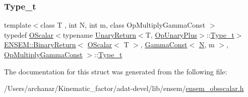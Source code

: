 \subsubsection{\texorpdfstring{Type\_t}{Type\_t}\hspace{0.1cm}{\footnotesize\ttfamily [3/3]}}
{\footnotesize\ttfamily template$<$class T , int N, int m, class Op\+Multiply\+Gamma\+Const $>$ \\
typedef \mbox{\hyperlink{classENSEM_1_1OScalar}{O\+Scalar}}$<$typename \mbox{\hyperlink{structENSEM_1_1UnaryReturn}{Unary\+Return}}$<$T, \mbox{\hyperlink{structENSEM_1_1OpUnaryPlus}{Op\+Unary\+Plus}}$>$\+::\mbox{\hyperlink{structENSEM_1_1BinaryReturn_3_01OScalar_3_01T_01_4_00_01GammaConst_3_01N_00_01m_01_4_00_01OpMultiplyGammaConst_01_4_a5ab97090c2ef0e27b663d6f546b03b3c}{Type\+\_\+t}}$>$ \mbox{\hyperlink{structENSEM_1_1BinaryReturn}{E\+N\+S\+E\+M\+::\+Binary\+Return}}$<$ \mbox{\hyperlink{classENSEM_1_1OScalar}{O\+Scalar}}$<$ T $>$, \mbox{\hyperlink{classENSEM_1_1GammaConst}{Gamma\+Const}}$<$ \mbox{\hyperlink{adat__devel_2lib_2hadron_2operator__name__util_8cc_a7722c8ecbb62d99aee7ce68b1752f337}{N}}, m $>$, \mbox{\hyperlink{structENSEM_1_1OpMultiplyGammaConst}{Op\+Multiply\+Gamma\+Const}} $>$\+::\mbox{\hyperlink{structENSEM_1_1BinaryReturn_3_01OScalar_3_01T_01_4_00_01GammaConst_3_01N_00_01m_01_4_00_01OpMultiplyGammaConst_01_4_a5ab97090c2ef0e27b663d6f546b03b3c}{Type\+\_\+t}}}



The documentation for this struct was generated from the following file\+:\begin{DoxyCompactItemize}
\item 
/\+Users/archanar/\+Kinematic\+\_\+factor/adat-\/devel/lib/ensem/\mbox{\hyperlink{adat-devel_2lib_2ensem_2ensem__obsscalar_8h}{ensem\+\_\+obsscalar.\+h}}\end{DoxyCompactItemize}
